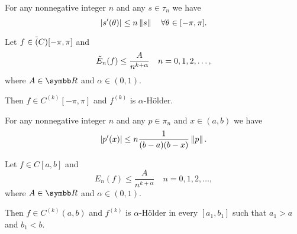 \begin{theorem}\label{thm:bernsteins_trigonometric_inequality}
  For any nonnegative integer \( n \) and any \( s \in \tau_n \) we have
  \begin{equation*}
    \left\vert s'(\theta) \right\vert \leq n \left\Vert s \right\Vert \quad\forall \theta \in [-\pi, \pi].
  \end{equation*}
\end{theorem}

\begin{theorem}\label{thm:bernsteins_trigonometric_theorem}
  Let \( f \in \tilde{(}C)[-\pi, \pi] \) and
  \begin{equation*}
    \tilde{E}_n(f) \leq \frac A {n^{k+\alpha}} \quad n = 0, 1, 2, \ldots,
  \end{equation*}
  where \( A \in \BR \) and \( \alpha \in (0, 1) \).

  Then \( f \in C^{(k)}[-\pi, \pi] \) and \( f^{(k)} \) is \( \alpha \)-H\"older.
\end{theorem}

\begin{theorem}\label{thm:bernsteins_algebraic_inequality}
  For any nonnegative integer \( n \) and any \( p \in \pi_n \) and \( x \in (a, b) \) we have
  \begin{equation*}
    \left\vert p'(x) \right\vert \leq n \frac 1 {(b - a)(b - x)} \left\Vert p \right\Vert.
  \end{equation*}
\end{theorem}

\begin{theorem}\label{thm:bernsteins_algebraic_theorem}
  Let \( f \in C[a, b] \) and
  \begin{equation*}
    E_n(f) \leq \frac A {n^{k+\alpha}} \quad n = 0, 1, 2, \ldots,
  \end{equation*}
  where \( A \in \BR \) and \( \alpha \in (0, 1) \).

  Then \( f \in C^{(k)}(a, b) \) and \( f^{(k)} \) is \( \alpha \)-H\"older in every \( [a_1, b_1] \) such that \( a_1 > a \) and \( b_1 < b \).
\end{theorem}
